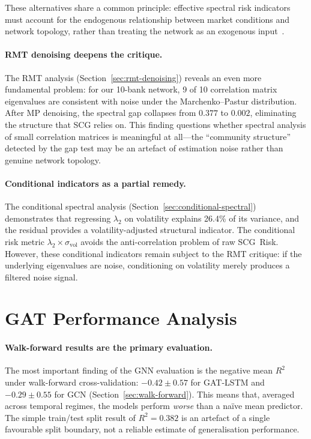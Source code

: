 These alternatives share a common principle: effective spectral risk indicators must account for the endogenous relationship between market conditions and network topology, rather than treating the network as an exogenous input~\cite{bardoscia2021physics}.

\paragraph{RMT denoising deepens the critique.}
The RMT analysis (Section~\ref{sec:rmt-denoising}) reveals an even more fundamental problem: for our 10-bank network, 9 of 10 correlation matrix eigenvalues are consistent with noise under the Marchenko--Pastur distribution. After MP denoising, the spectral gap collapses from $0.377$ to $0.002$, eliminating the structure that SCG relies on. This finding questions whether spectral analysis of small correlation matrices is meaningful at all---the ``community structure'' detected by the gap test may be an artefact of estimation noise rather than genuine network topology.

\paragraph{Conditional indicators as a partial remedy.}
The conditional spectral analysis (Section~\ref{sec:conditional-spectral}) demonstrates that regressing $\lambda_2$ on volatility explains 26.4\% of its variance, and the residual provides a volatility-adjusted structural indicator. The conditional risk metric $\lambda_2 \times \sigma_{\text{vol}}$ avoids the anti-correlation problem of raw SCG~Risk. However, these conditional indicators remain subject to the RMT critique: if the underlying eigenvalues are noise, conditioning on volatility merely produces a filtered noise signal.


\section{GAT Performance Analysis}
\label{sec:gat-analysis}

\paragraph{Walk-forward results are the primary evaluation.}
The most important finding of the GNN evaluation is the negative mean $R^2$ under walk-forward cross-validation: $-0.42 \pm 0.57$ for GAT-LSTM and $-0.29 \pm 0.55$ for GCN (Section~\ref{sec:walk-forward}). This means that, averaged across temporal regimes, the models perform \emph{worse} than a na\"ive mean predictor. The simple train/test split result of $R^2 = 0.382$ is an artefact of a single favourable split boundary, not a reliable estimate of generalisation performance.

